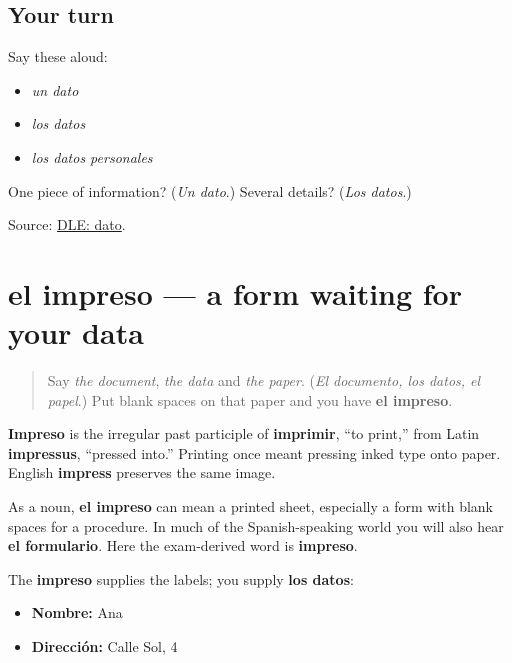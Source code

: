 \subsection*{Your turn}
Say these aloud:

\begin{itemize}
\raggedright
  \item \emph{un dato}
  \item \emph{los datos}
  \item \emph{los datos personales}
\end{itemize}

\begin{tcolorbox}[breakable,colback=teal!4,colframe=teal!35!black,title={Before you move on}]
One piece of information? (\emph{Un dato}.) Several details? (\emph{Los datos}.)

Source: \href{https://dle.rae.es/dato}{DLE: dato}.
\end{tcolorbox}
\section[el impreso]{el impreso — a form waiting for your data}

\label{lesson:ES-C406-impreso}



\begin{quote}
Say \emph{the document}, \emph{the data} and \emph{the paper}. (\emph{El documento, los datos, el papel}.) Put blank spaces on that paper and you have \textbf{el impreso}.
\end{quote}

\begin{cousinweb}
\textbf{Impreso} is the irregular past participle of \textbf{imprimir}, “to print,” from Latin \textbf{impressus}, “pressed into.” Printing once meant pressing inked type onto paper. English \textbf{impress} preserves the same image.

As a noun, \textbf{el impreso} can mean a printed sheet, especially a form with blank spaces for a procedure. In much of the Spanish-speaking world you will also hear \textbf{el formulario}. Here the exam-derived word is \textbf{impreso}.
\end{cousinweb}

\begin{grammarlens}[title={Grammar Lens: a form has two sides}]
The \textbf{impreso} supplies the labels; you supply \textbf{los datos}:

\begin{itemize}
\raggedright
  \item \textbf{Nombre:} Ana
  \item \textbf{Dirección:} Calle Sol, 4
\end{itemize}
\end{grammarlens}

